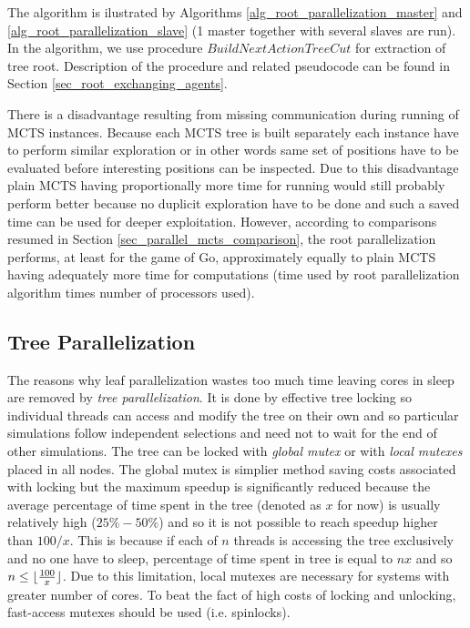 The algorithm is ilustrated by Algorithms \ref{alg_root_parallelization_master} and 
\ref{alg_root_parallelization_slave} (1 master together with several slaves are run). 
In the algorithm, we use 
procedure $BuildNextActionTreeCut$ for extraction of tree root. Description of the procedure
and related pseudocode can be found in Section \ref{sec_root_exchanging_agents}.

There is a disadvantage resulting from missing communication during running of MCTS
instances. Because each MCTS tree is built separately each instance have to perform similar
exploration or in other words same set of positions have to be evaluated before interesting
positions can be inspected. Due to this disadvantage plain MCTS having proportionally more time for
running would still probably perform better because no duplicit exploration have to be done and such
a saved time can be used for deeper exploitation. However, according to comparisons resumed
in Section \ref{sec_parallel_mcts_comparison}, the root parallelization performs, at least for the 
game of Go, approximately equally to plain MCTS having adequately more time for computations
(time used by root parallelization algorithm times number of processors used).



\subsection{Tree Parallelization}


The reasons why leaf parallelization wastes too much time leaving cores in sleep are removed by
\emph{tree parallelization}. It is done by effective tree locking so individual threads can access
and modify the tree on their own and so particular simulations follow independent selections and
need not to wait for the end of other simulations. The tree can be locked with \emph{global mutex}
or with \emph{local mutexes} placed in all nodes. The global mutex is simplier method saving costs
associated with locking but the maximum speedup is significantly reduced because the average
percentage of time spent in the tree (denoted as $x$ for now) is usually relatively high ($25\%-50\%$) 
and
so it is not possible to reach speedup higher than $100/x$. This is because if each of $n$
threads is
accessing the tree exclusively and no one have to sleep, percentage of time spent in 
tree is
equal to $n x$ and so $n \le \lfloor {100 \over{x}} \rfloor$. Due to this limitation, local mutexes
are necessary for systems with greater number of cores. To beat the fact of high costs of locking and
unlocking, fast-access mutexes should be used (i.e. spinlocks).

